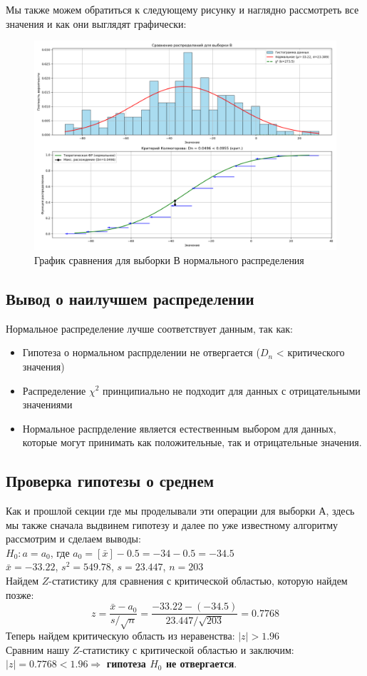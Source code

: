 \documentclass[12pt]{article}
\begin{document}
Мы также можем обратиться к следующему рисунку и наглядно рассмотреть все значения и как они выглядят графически:
\begin{figure}[h]
\centering
\includegraphics[scale=0.5]{normal_b.png}
\caption{График сравнения для выборки В нормального распределения}    
\end{figure}

\newpage

\subsection{Вывод о наилучшем распределении}
Нормальное распределение лучше соответствует данным, так как:
\begin{itemize}
    \item Гипотеза о нормальном распрделении не отвергается ($D_n$ < критического значения)
    \item Распределение $\chi^2$ принципиально не подходит для данных с отрицательными значениями
    \item Нормальное распрделение является естественным выбором для данных, которые могут принимать как положительные, так и отрицательные значения.
\end{itemize}

\subsection{Проверка гипотезы о среднем}
Как и прошлой секции где мы проделывали эти операции для выборки А, здесь мы также сначала выдвинем гипотезу и далее по уже известному алгоритму рассмотрим и сделаем выводы:\\
$H_0: a = a_0$, где $a_0 = [\bar{x}] - 0.5 = -34 - 0.5 = -34.5$ \\
$\bar{x} = -33.22$, $s^2 = 549.78$, $s = 23.447$, $n = 203$ \\
Найдем $Z$-статистику для сравнения с критической областью, которую найдем позже:
\[
z = \frac{\bar{x} - a_0}{s/\sqrt{n}} = \frac{-33.22 - (-34.5)}{23.447/\sqrt{203}} = 0.7768
\]
Теперь найдем критическую область из неравенства: $|z| > 1.96$ \\
Сравним нашу $Z$-статистику с критической областью и заключим: $|z| = 0.7768 < 1.96 \Rightarrow$ \textbf{гипотеза $H_0$ не отвергается}.
\end{document}
